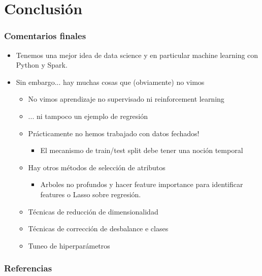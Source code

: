 \documentclass[leqno, 10pt, envcountsect]{beamer}
\numberwithin{equation}{section}
\theoremstyle{definition}
\theoremstyle{example}
\numberwithin{figure}{section}
\numberwithin{table}{section}
\let\olditem\item
\renewcommand{\item}{%
\olditem\vspace{1pt}}
\begin{document}
\section{Conclusión}
\label{sec:aprendizaje_no_supervisado}
\begin{frame}[fragile=singleslide]
  \frametitle{Comentarios finales}
  \begin{itemize}
    \item Tenemos una mejor idea de data science y en particular machine
      learning con Python y Spark.
    \item Sin embargo... hay muchas cosas que (obviamente) no vimos
    \begin{itemize}
      \item No vimos aprendizaje no supervisado ni reinforcement learning
      \item ... ni tampoco un ejemplo de regresión
      \item Prácticamente no hemos trabajado con datos fechados!
        \begin{itemize}
          \item El mecanismo de train/test split debe tener una noción
            temporal
        \end{itemize}
        \item Hay otros métodos de selección de atributos
          \begin{itemize}
            \item Arboles no profundos y hacer feature importance para
              identificar features o Lasso sobre regresión.
          \end{itemize}
          \item Técnicas de reducción de dimensionalidad
          \item Técnicas de corrección de desbalance e clases
          \item Tuneo de hiperparámetros
    \end{itemize}
  \end{itemize}
\end{frame}



\begin{frame}[fragile=singleslide]
  \frametitle{Referencias}
  \begin{columns}
    \column{0.85\paperwidth}
    \printbibliography
  \end{columns}
\end{frame}
\end{document}
